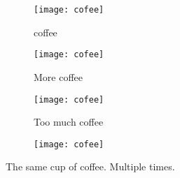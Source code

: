 \documentclass{article}
\begin{document}
	\begin{figure}[h!]
		\centering
		\begin{subfigure}[b]{0.2\linewidth}
			
			\texttt{[image: cofee]}
			\caption{coffee}\end{subfigure}
		\begin{subfigure}[b]{0.2\linewidth}
			\texttt{[image: cofee]}
			\caption{More coffee}
		\end{subfigure}
		\begin{subfigure}[b]{0.2\linewidth}
		\texttt{[image: cofee]}
		\caption{Too much coffee}
	\end{subfigure}
	\begin{subfigure}[b]{0.5\linewidth}
	\texttt{[image: cofee]}
\end{subfigure}
\caption{The same cup of coffee. Multiple times.}
\label{fig:coffee3}
\end{figure}
	
\end{document}
